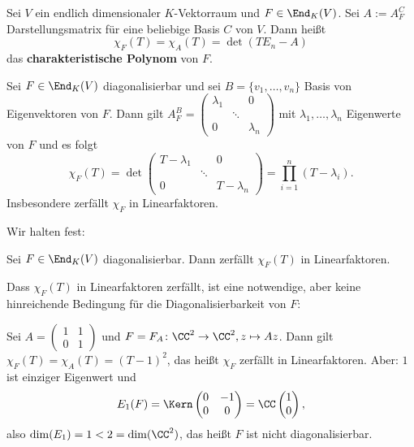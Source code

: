 \begin{definition}
	\label{def:2.3}
	Sei $V$ ein endlich dimensionaler $K$-Vektorraum und $F \in \End_K(V)$.
	Sei $A:= A_F^C$ Darstellungsmatrix für eine beliebige Basis $C$ von $V$.
	Dann heißt
	\[
		\chi_F(T) = \chi_A(T) = \det(TE_n-A)
	\]
	das \textbf{charakteristische Polynom} von $F$. 
\end{definition}

\begin{beispiel}
	\label{bsp:2.4}
	Sei $F \in \End_K(V)$ diagonalisierbar und sei $B = \{v_1,\dots,v_n\}$ Basis von Eigenvektoren von $F$.
	Dann gilt $A_F^B = \begin{pmatrix}
	\lambda_1 &  & 0 \\ 
	& \ddots &  \\ 
	0 &  & \lambda_n
	\end{pmatrix}$ mit $\lambda_1,\dots,\lambda_n$ Eigenwerte von $F$ und es folgt
	\[
		\chi_F(T) = \det\begin{pmatrix}
			T-\lambda_1 &  & 0 \\ 
			& \ddots &  \\ 
			0 &  & T-\lambda_n
			\end{pmatrix} = \prod_{i=1}^{n} (T-\lambda_i).
	\]
	Insbesondere zerfällt $\chi_F$ in Linearfaktoren.
\end{beispiel}

Wir halten fest:
\begin{satz}
	\label{satz:2.5}
	Sei $F \in \End_K(V)$ diagonalisierbar.
	Dann zerfällt $\chi_F(T)$ in Linearfaktoren.
\end{satz}

\begin{beispiel}
	\label{bsp:2.6}
	Dass $\chi_F(T)$ in Linearfaktoren zerfällt, ist eine notwendige, aber keine hinreichende Bedingung für die Diagonalisierbarkeit von $F$:
	
	Sei $A = \begin{pmatrix}
	1 & 1 \\ 
	0 & 1
	\end{pmatrix}$ und $F = F_A\colon \CC^2 \rightarrow \CC^2, z \mapsto Az$.
	Dann gilt $\chi_F(T) = \chi_A(T) = (T-1)^2$, das heißt $\chi_F$ zerfällt in Linearfaktoren. Aber: $1$ ist einziger Eigenwert und
	\[
		E_1(F) = \Kern\begin{pmatrix}
		0 & -1 \\ 
		0 & 0
		\end{pmatrix} = \CC \begin{pmatrix}
		1 \\ 
		0 
		\end{pmatrix},
	\]
	also $\dim(E_1) = 1 < 2 = \dim(\CC^2)$, das heißt $F$ ist nicht diagonalisierbar.
\end{beispiel}

